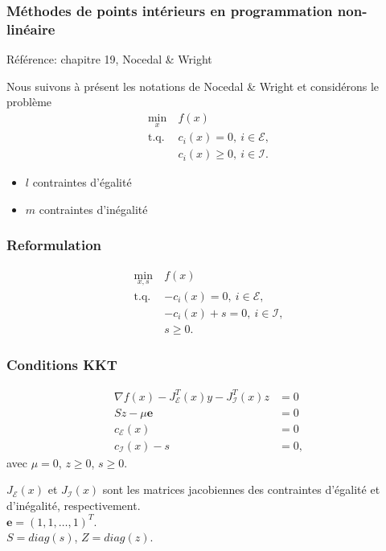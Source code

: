 \documentclass[usepdftitle=false,aspectratio=169]{beamer}
\def\cE{\mathcal{E}}
\def\cI{\mathcal{I}}
\def\be{\boldsymbol{e}}
\begin{document}
\begin{frame}
\frametitle{Méthodes de points intérieurs en programmation non-linéaire}

Référence: chapitre 19, Nocedal \& Wright

\mbox{}

Nous suivons à présent les notations de Nocedal \& Wright et considérons le problème
\begin{align*}
\min_x \ & f(x) \\
\mbox{t.q. } & c_i(x) = 0,\ i \in \cE, \\
& c_i(x) \geq 0,\ i \in \cI.
\end{align*}
\begin{itemize}
	\item $l$ contraintes d'égalité
	\item $m$ contraintes d'inégalité
\end{itemize}

\end{frame}

\begin{frame}
\frametitle{Reformulation}

\begin{align*}
\min_{x,s} \ & f(x) \\
\mbox{t.q. } & -c_i(x) = 0,\ i \in \cE, \\
& - c_i(x) + s = 0,\ i \in \cI, \\
& s \geq 0.
\end{align*}

\end{frame}

\begin{frame}
\frametitle{Conditions KKT}

\begin{align*}
\nabla f(x) - J^T_{\cE}(x) y - J^T_{\cI} (x) z &= 0 \\
Sz - \mu \be &= 0 \\
c_{\cE}(x) &= 0 \\
c_{\cI}(x) - s &= 0,
\end{align*}
avec $\mu = 0$, $z \geq 0$, $s \geq 0$.

\mbox{}

$J_{\cE}(x)$ et $J_{\cI}(x)$ sont les matrices jacobiennes des contraintes d'égalité et d'inégalité, respectivement.\\
$\be = (1, 1,\ldots, 1)^T$. \\
$S = diag(s)$, $Z = diag(z)$.

\end{frame}
\end{document}
